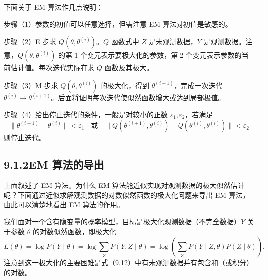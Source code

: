 \documentclass[UTF8, 12pt, fontset=fandol, oneside]{ctexart}
\begin{document}
下面关于 EM 算法作几点说明：

步骤（1）参数的初值可以任意选择，但需注意 EM 算法对初值是敏感的。

步骤（2）E 步求 $Q(\theta,\theta^{(i)})$。$Q$ 函数式中 $Z$ 是未观测数据，$Y$ 是观测数据。注意，$Q(\theta,\theta^{(i)})$ 的第 1 个变元表示要极大化的参数，第 2 个变元表示参数的当前估计值。每次迭代实际在求 $Q$ 函数及其极大。

步骤（3）M 步求 $Q(\theta,\theta^{(i)})$ 的极大化，得到 $\theta^{(i+1)}$，完成一次迭代 $\theta^{(i)}\to\theta^{(i+1)}$。后面将证明每次迭代使似然函数增大或达到局部极值。

步骤（4）给出停止迭代的条件，一般是对较小的正数 $\varepsilon_1,\varepsilon_2$，若满足
\[
  \|\theta^{(i+1)}-\theta^{(i)}\|<\varepsilon_1
  \quad\text{或}\quad
  \|Q(\theta^{(i+1)},\theta^{(i)})-Q(\theta^{(i)},\theta^{(i)})\|<\varepsilon_2
\]
则停止迭代。

\subsection*{9.1.2\quad EM 算法的导出}

上面叙述了 EM 算法。为什么 EM 算法能近似实现对观测数据的极大似然估计呢？下面通过近似求解观测数据的对数似然函数的极大化问题来导出 EM 算法，由此可以清楚地看出 EM 算法的作用。

我们面对一个含有隐变量的概率模型，目标是极大化观测数据（不完全数据）$Y$ 关于参数 $\theta$ 的对数似然函数，即极大化
\begin{equation}
  L(\theta)=\log P(Y\mid\theta)=\log\sum_Z P(Y,Z\mid\theta)
  =\log\left(\sum_Z P(Y\mid Z,\theta)P(Z\mid\theta)\right).
  \tag{9.12}
\end{equation}
注意到这一极大化的主要困难是式（9.12）中有未观测数据并有包含和（或积分）的对数。
\end{document}
